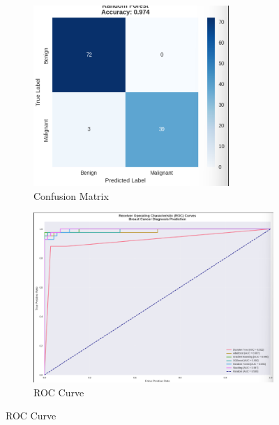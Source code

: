 \documentclass[11pt]{article}
\begin{document}
\begin{figure}[H]
\centering
\begin{subfigure}{0.45\textwidth}
  \centering
  \includegraphics[width=\linewidth]{f5.png}
  \caption{Confusion Matrix}
\end{subfigure}
\hfill
\begin{subfigure}{0.45\textwidth}
  \centering
  \includegraphics[width=\linewidth]{x1.png}
  \caption{ROC Curve}
\end{subfigure}


\end{figure}
\end{document}
